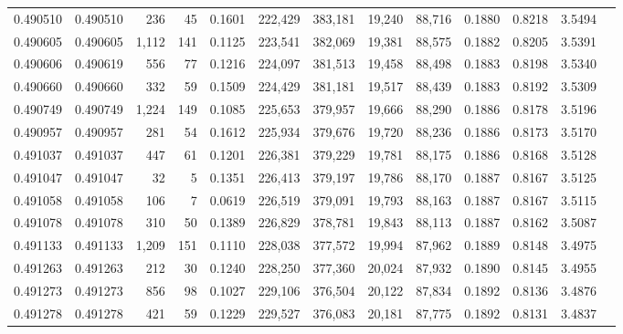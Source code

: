 \begin{tabular}{rrrrrrrrrrrrr}
0.490510 & 0.490510 &   236 &    45 &                                     0.1601 & 222,429 & 383,181 &  19,240 &  88,716 & 0.1880 & 0.8218 & 3.5494 \\
0.490605 & 0.490605 & 1,112 &   141 &                                     0.1125 & 223,541 & 382,069 &  19,381 &  88,575 & 0.1882 & 0.8205 & 3.5391 \\
0.490606 & 0.490619 &   556 &    77 &                                     0.1216 & 224,097 & 381,513 &  19,458 &  88,498 & 0.1883 & 0.8198 & 3.5340 \\
0.490660 & 0.490660 &   332 &    59 &                                     0.1509 & 224,429 & 381,181 &  19,517 &  88,439 & 0.1883 & 0.8192 & 3.5309 \\
0.490749 & 0.490749 & 1,224 &   149 &                                     0.1085 & 225,653 & 379,957 &  19,666 &  88,290 & 0.1886 & 0.8178 & 3.5196 \\
0.490957 & 0.490957 &   281 &    54 &                                     0.1612 & 225,934 & 379,676 &  19,720 &  88,236 & 0.1886 & 0.8173 & 3.5170 \\
0.491037 & 0.491037 &   447 &    61 &                                     0.1201 & 226,381 & 379,229 &  19,781 &  88,175 & 0.1886 & 0.8168 & 3.5128 \\
0.491047 & 0.491047 &    32 &     5 &                                     0.1351 & 226,413 & 379,197 &  19,786 &  88,170 & 0.1887 & 0.8167 & 3.5125 \\
0.491058 & 0.491058 &   106 &     7 &                                     0.0619 & 226,519 & 379,091 &  19,793 &  88,163 & 0.1887 & 0.8167 & 3.5115 \\
0.491078 & 0.491078 &   310 &    50 &                                     0.1389 & 226,829 & 378,781 &  19,843 &  88,113 & 0.1887 & 0.8162 & 3.5087 \\
0.491133 & 0.491133 & 1,209 &   151 &                                     0.1110 & 228,038 & 377,572 &  19,994 &  87,962 & 0.1889 & 0.8148 & 3.4975 \\
0.491263 & 0.491263 &   212 &    30 &                                     0.1240 & 228,250 & 377,360 &  20,024 &  87,932 & 0.1890 & 0.8145 & 3.4955 \\
0.491273 & 0.491273 &   856 &    98 &                                     0.1027 & 229,106 & 376,504 &  20,122 &  87,834 & 0.1892 & 0.8136 & 3.4876 \\
0.491278 & 0.491278 &   421 &    59 &                                     0.1229 & 229,527 & 376,083 &  20,181 &  87,775 & 0.1892 & 0.8131 & 3.4837 \\

\end{tabular}
